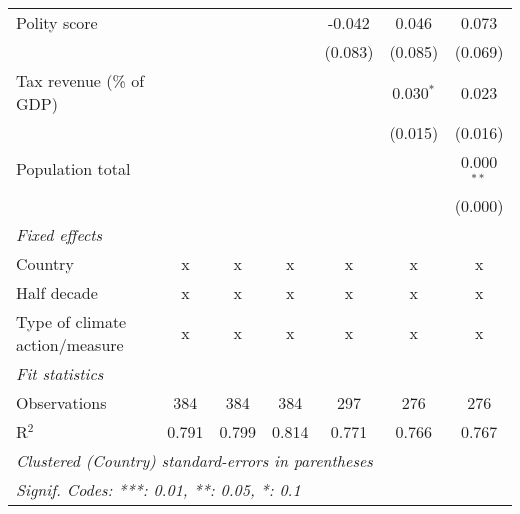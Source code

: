 \begin{tabular}{lcccccc}
   Polity score                                                         &         &               &                & -0.042         & 0.046          & 0.073\\   
                                                                        &         &               &                & (0.083)        & (0.085)        & (0.069)\\   
   Tax revenue (\% of GDP)                                              &         &               &                &                & 0.030$^{*}$    & 0.023\\   
                                                                        &         &               &                &                & (0.015)        & (0.016)\\   
   Population total                                                     &         &               &                &                &                & 0.000$^{**}$\\   
                                                                        &         &               &                &                &                & (0.000)\\   
   \emph{Fixed effects}\\
   Country                                                              & x       & x             & x              & x              & x              & x\\  
   Half decade                                                          & x       & x             & x              & x              & x              & x\\  
   Type of climate action/measure                                       & x       & x             & x              & x              & x              & x\\  
   \midrule \emph{Fit statistics}\\
   Observations                                                         & 384     & 384           & 384            & 297            & 276            & 276\\  
   R$^2$                                                                & 0.791   & 0.799         & 0.814          & 0.771          & 0.766          & 0.767\\  
   \midrule
   \multicolumn{7}{l}{\emph{Clustered (Country) standard-errors in parentheses}}\\
   \multicolumn{7}{l}{\emph{Signif. Codes: ***: 0.01, **: 0.05, *: 0.1}}\\
\end{tabular}
\par\endgroup


